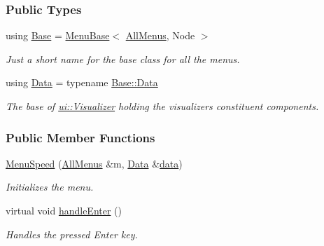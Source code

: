\subsubsection*{Public Types}
\begin{DoxyCompactItemize}
\item 
using \hyperlink{structMenuSpeed_a6b76b512829e77b062455af192d83988}{Base} = \hyperlink{structMenuBase}{Menu\+Base}$<$ \hyperlink{structAllMenus}{All\+Menus}, Node $>$\hypertarget{structMenuSpeed_a6b76b512829e77b062455af192d83988}{}\label{structMenuSpeed_a6b76b512829e77b062455af192d83988}

\begin{DoxyCompactList}\small\item\em Just a short name for the base class for all the menus. \end{DoxyCompactList}\item 
using \hyperlink{structMenuSpeed_a5347554481c522f1d6e2074d16767e48}{Data} = typename \hyperlink{structMenuBase_a473a45fd8adbc75a9220b64753ae3837}{Base\+::\+Data}\hypertarget{structMenuSpeed_a5347554481c522f1d6e2074d16767e48}{}\label{structMenuSpeed_a5347554481c522f1d6e2074d16767e48}

\begin{DoxyCompactList}\small\item\em The base of \hyperlink{structui_1_1Visualizer}{ui\+::\+Visualizer} holding the visualizer\textquotesingle{}s constituent components. \end{DoxyCompactList}\end{DoxyCompactItemize}
\subsubsection*{Public Member Functions}
\begin{DoxyCompactItemize}
\item 
\hyperlink{structMenuSpeed_a6e4c397b98aa25dd90b3b7f1cfdaf7ea}{Menu\+Speed} (\hyperlink{structAllMenus}{All\+Menus} \&m, \hyperlink{structMenuBase_a473a45fd8adbc75a9220b64753ae3837}{Data} \&\hyperlink{structMenuBase_a819aaaa06ede3bffbb12c1390657ef64}{data})
\begin{DoxyCompactList}\small\item\em Initializes the menu. \end{DoxyCompactList}\item 
virtual void \hyperlink{structMenuSpeed_af94e479fc11fb9e609ab59b28be2f8bd}{handle\+Enter} ()\hypertarget{structMenuSpeed_af94e479fc11fb9e609ab59b28be2f8bd}{}\label{structMenuSpeed_af94e479fc11fb9e609ab59b28be2f8bd}

\begin{DoxyCompactList}\small\item\em Handles the pressed Enter key. \end{DoxyCompactList}\end{DoxyCompactItemize}
